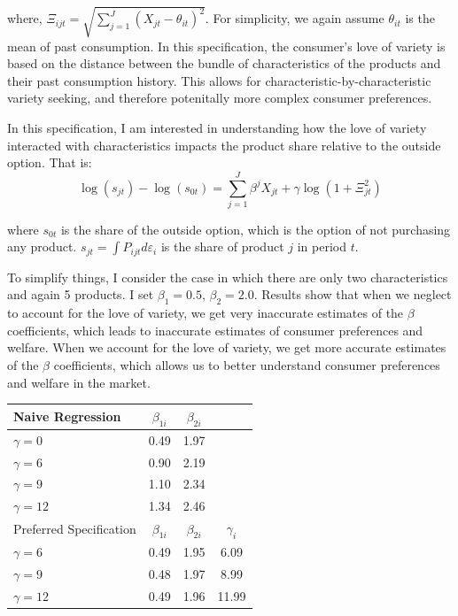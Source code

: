 \documentclass[12pt]{article}
\begin{document}
  where, $\Xi_{ijt} = \sqrt{\sum_{j=1}^J(X_{jt}-\theta_{it})^2}$. For simplicity, we again assume $\theta_{it}$ is the mean of past consumption. In this specification, the consumer's love of variety is based on the distance between the bundle of characteristics of the products and their past consumption history. This allows for characteristic-by-characteristic variety seeking, and therefore potenitally more complex consumer preferences. 

  In this specification, I am interested in understanding how the love of variety interacted with characteristics impacts the product share relative to the outside option. That is:
  \begin{equation}
    \log{(s_{jt})} - \log{(s_{0t})} = \sum_{j=1}^J\beta^j X_{jt} + \gamma \log(1 + \Xi_{jt}^2)
  \end{equation}

  where $s_{0t}$ is the share of the outside option, which is the option of not purchasing any product. $s_{jt} = \int P_{ijt}d\varepsilon_i$ is the share of product $j$ in period $t$.

  To simplify things, I consider the case in which there are only two characteristics and again 5 products. I set $\beta_1 =0.5$, $\beta_2=2.0$. Results show that when we neglect to account for the love of variety, we get very inaccurate estimates of the $\beta$ coefficients, which leads to inaccurate estimates of consumer preferences and welfare. When we account for the love of variety, we get more accurate estimates of the $\beta$ coefficients, which allows us to better understand consumer preferences and welfare in the market.

  \begin{center}
  \begin{threeparttable}
    \centering
    \begin{tabular}{lccc}
    \hline\hline
      Naive Regression & $\beta_{1i}$ & $\beta_{2i}$ & \\
    \hline
        $\gamma = 0$ & 0.49 & 1.97 \\
        $\gamma = 6$ & 0.90 & 2.19 \\
        $\gamma = 9$ & 1.10 & 2.34 \\
        $\gamma = 12$ & 1.34 & 2.46 \\
      \hline
      Preferred Specification & $\beta_{1i}$ & $\beta_{2i}$ & $\gamma_i$ \\
    \hline
        $\gamma = 6$ & 0.49 & 1.95 & 6.09 \\
        $\gamma = 9$ & 0.48 & 1.97 & 8.99 \\
        $\gamma = 12$ & 0.49 & 1.96 & 11.99 \\
    \hline\hline
    \end{tabular}
    \end{threeparttable}
  \end{center}
\end{document}
